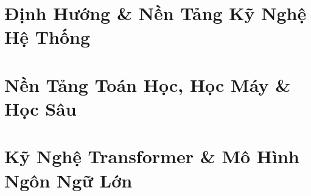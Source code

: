 \documentclass[11pt,a4paper,oneside]{book}
\begin{document}
\frontmatter



\clearpage
{}
\tableofcontents
\clearpage

\mainmatter

\part{Định Hướng \& Nền Tảng Kỹ Nghệ Hệ Thống}







\part{Nền Tảng Toán Học, Học Máy \& Học Sâu}





\part{Kỹ Nghệ Transformer \& Mô Hình Ngôn Ngữ Lớn}
\end{document}
